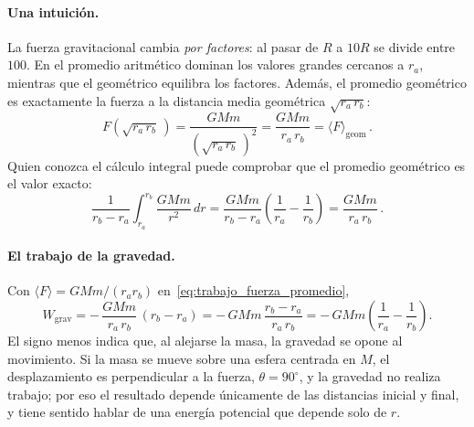 \paragraph{Una intuición.}
La fuerza gravitacional cambia \emph{por factores}: al pasar de $R$ a $10R$ se
divide entre $100$. En el promedio aritmético dominan los valores grandes
cercanos a $r_{a}$, mientras que el geométrico equilibra los factores. Además,
el promedio geométrico es exactamente la fuerza a la distancia media
geométrica $\sqrt{r_{a}\,r_{b}}$:
\begin{equation}
  F\!\left(\sqrt{r_{a}\,r_{b}}\,\right)
  = \frac{GMm}{\left(\sqrt{r_{a}\,r_{b}}\,\right)^{2}}
  = \frac{GMm}{r_{a}\,r_{b}}
  = \langle F\rangle_{\text{geom}} \,.
  \label{eq:fuerza_media_geometrica}
\end{equation}
Quien conozca el cálculo integral puede comprobar que el promedio geométrico
es el valor exacto:
\begin{equation}
  \frac{1}{r_{b} - r_{a}} \int_{r_{a}}^{r_{b}} \frac{GMm}{r^{2}}\,dr
  = \frac{GMm}{r_{b} - r_{a}}\left(\frac{1}{r_{a}} - \frac{1}{r_{b}}\right)
  = \frac{GMm}{r_{a}\,r_{b}} \,.
  \label{eq:promedio_integral}
\end{equation}

\paragraph{El trabajo de la gravedad.}
Con $\langle F\rangle = GMm/(r_{a} r_{b})$
en~\eqref{eq:trabajo_fuerza_promedio},
\begin{equation}
  W_{\text{grav}}
  = -\,\frac{GMm}{r_{a}\,r_{b}}\,(r_{b} - r_{a})
  = -\,GMm\,\frac{r_{b} - r_{a}}{r_{a}\,r_{b}}
  = -\,GMm\left(\frac{1}{r_{a}} - \frac{1}{r_{b}}\right) .
  \label{eq:trabajo_grav_r1_r2}
\end{equation}
El signo menos indica que, al alejarse la masa, la gravedad se opone al
movimiento. Si la masa se mueve sobre una esfera centrada en $M$, el
desplazamiento es perpendicular a la fuerza, $\theta = 90^{\circ}$, y la
gravedad no realiza trabajo; por eso el resultado depende únicamente de las
distancias inicial y final, y tiene sentido hablar de una energía potencial
que depende solo de $r$.

